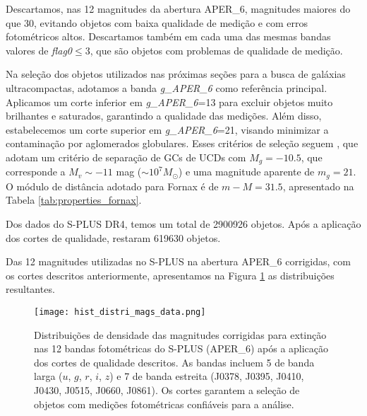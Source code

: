 Descartamos, nas 12 magnitudes da abertura APER\_6, magnitudes maiores do que 30, evitando objetos com baixa qualidade de medição e com erros fotométricos altos. Descartamos também em cada uma das mesmas bandas valores de \textit{flag0}$\leq$3, que são objetos com problemas de qualidade de medição.

Na seleção dos objetos utilizados nas próximas seções para a busca de galáxias ultracompactas, adotamos a banda \textit{g\_APER\_6} como referência principal. Aplicamos um corte inferior em \textit{g\_APER\_6}=13 para excluir objetos muito brilhantes e saturados, garantindo a qualidade das medições. Além disso, estabelecemos um corte superior em \textit{g\_APER\_6}=21, visando minimizar a contaminação por aglomerados globulares. Esses critérios de seleção seguem \cite{Cantiello_2020}, que adotam um critério de separação de GCs de UCDs com $M_g=-10.5$, que corresponde a $M_v\sim -11$ mag ($\sim10^7 M_\odot$) e uma magnitude aparente de $m_g=21$. O módulo de distância adotado para Fornax é de $m-M=31.5$, apresentado na Tabela \ref{tab:properties_fornax}.

Dos dados do S-PLUS DR4, temos um total de 2900926 objetos. Após a aplicação dos cortes de qualidade, restaram 619630 objetos.

Das 12 magnitudes utilizadas no S-PLUS na abertura APER\_6 corrigidas, com os cortes descritos anteriormente, apresentamos na Figura \ref{fig:hist_distri_mags_data} as distribuições resultantes.

\begin{figure}[!ht]
    \begin{center}
    \texttt{[image: hist\_distri\_mags\_data.png]}
    \caption[]{Distribuições de densidade das magnitudes corrigidas para extinção nas 12 bandas fotométricas do S-PLUS (APER\_6) após a aplicação dos cortes de qualidade descritos. As bandas incluem 5 de banda larga ($u$, $g$, $r$, $i$, $z$) e 7 de banda estreita (J0378, J0395, J0410, J0430, J0515, J0660, J0861). Os cortes garantem a seleção de objetos com medições fotométricas confiáveis para a análise.}
    \label{fig:hist_distri_mags_data}
    \end{center}
\end{figure}
